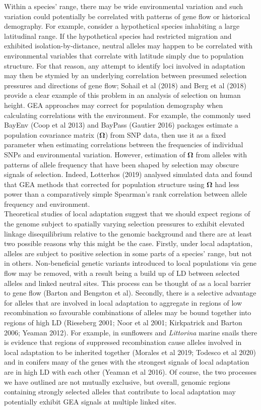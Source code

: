\documentclass[11pt,twoside,lineno]{GSA_format}
\begin{document}
Within a species' range, there may be wide environmental variation and such variation could potentially be correlated with patterns of gene flow or historical demography. For example, consider a hypothetical species inhabiting a large latitudinal range. If the hypothetical species had restricted migration and exhibited isolation-by-distance, neutral alleles may happen to be correlated with environmental variables that correlate with latitude simply due to population structure. For that reason, any attempt to identify loci involved in adaptation may then be stymied by an underlying correlation between presumed selection pressures and directions of gene flow; Sohail et al (2018) and Berg et al (2018) provide a clear example of this problem in an analysis of selection on human height. GEA approaches may correct for population demography when calculating correlations with the environment. For example, the commonly used BayEnv (Coop et al 2013) and BayPass (Gautier 2016) packages estimate a population covariance matrix (\textbf{$\mathbf{\Omega}$}) from SNP data, then use it as a fixed parameter when estimating correlations between the frequencies of individual SNPs and environmental variation. However, estimation of \textbf{$\mathbf{\Omega}$} from alleles with patterns of allele frequency that have been shaped by selection may obscure signals of selection. Indeed, Lotterhos (2019) analysed simulated data and found that GEA methods that corrected for population structure using \textbf{$\mathbf{\Omega}$} had less power than a comparatively simple Spearman's rank correlation between allele frequency and environment. \\

Theoretical studies of local adaptation suggest that we should expect regions of the genome subject to spatially varying selection pressures to exhibit elevated linkage disequilibrium relative to the genomic background and there are at least two possible reasons why this might be the case. Firstly, under local adaptation, alleles are subject to positive selection in some parts of a species' range, but not in others. Non-beneficial genetic variants introduced to local populations via gene flow may be removed, with a result being a build up of LD between selected alleles and linked neutral sites. This process can be thought of as a local barrier to gene flow (Barton and Bengston et al). Secondly, there is a selective advantage for alleles that are involved in local adaptation to aggregate in regions of low recombination so favourable combinations of alleles may be bound together into regions of high LD (Rieseberg 2001; Noor et al 2001; Kirkpatrick and Barton 2006; Yeaman 2012). For example, in sunflowers and \textit{Littorina} marine snails there is evidence that regions of suppressed recombination cause alleles involved in local adaptation to be inherited together (Morales et al 2019; Todesco et al 2020) and in conifers many of the genes with the strongest signals of local adaptation are in high LD with each other (Yeaman et al 2016). Of course, the two processes we have outlined are not mutually exclusive, but overall, genomic regions containing strongly selected alleles that contribute to local adaptation may potentially exhibit GEA signals at multiple linked sites. \\
\end{document}
